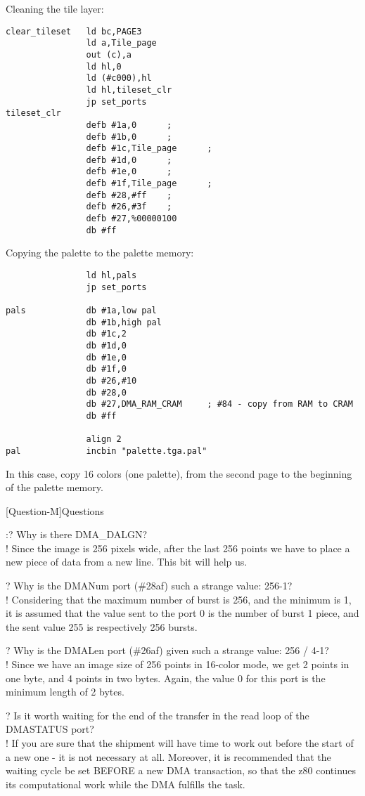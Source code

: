 Cleaning the tile layer:
\begin{verbatim}
clear_tileset   ld bc,PAGE3
                ld a,Tile_page
                out (c),a
                ld hl,0
                ld (#c000),hl
                ld hl,tileset_clr
                jp set_ports
tileset_clr
                defb #1a,0      ;
                defb #1b,0      ;
                defb #1c,Tile_page      ;
                defb #1d,0      ;
                defb #1e,0      ;
                defb #1f,Tile_page      ;
                defb #28,#ff    ;
                defb #26,#3f    ;
                defb #27,%00000100
                db #ff
\end{verbatim}
Copying the palette to the palette memory:
\begin{verbatim}
                ld hl,pals
                jp set_ports

pals            db #1a,low pal
                db #1b,high pal
                db #1c,2
                db #1d,0
                db #1e,0
                db #1f,0
                db #26,#10
                db #28,0
                db #27,DMA_RAM_CRAM     ; #84 - copy from RAM to CRAM
                db #ff

                align 2
pal             incbin "palette.tga.pal"
\end{verbatim}
In this case, copy 16 colors (one palette), from the second page to
the beginning of the palette memory.

[Question-M]Questions

:? Why is there DMA\_DALGN?\\
! Since the image is 256 pixels wide, after the last 256 points we
have to place a new piece of data from a new line. This bit will help
us.

? Why is the DMANum port (\#28af) such a strange value: 256-1?\\
! Considering that the maximum number of burst is 256, and the minimum
is 1, it is assumed that the value sent to the port 0 is the number of
burst 1 piece, and the sent value 255 is respectively 256 bursts.

? Why is the DMALen port (\#26af) given such a strange value: 256 /
4-1?\\
! Since we have an image size of 256 points in 16-color mode, we get 2
points in one byte, and 4 points in two bytes.  Again, the value 0 for
this port is the minimum length of 2 bytes.

? Is it worth waiting for the end of the transfer in the read loop of
the DMASTATUS port?\\
! If you are sure that the shipment will have time to work out before
the start of a new one - it is not necessary at all. Moreover, it is
recommended that the waiting cycle be set BEFORE a new DMA
transaction, so that the z80 continues its computational work while
the DMA fulfills the task.

